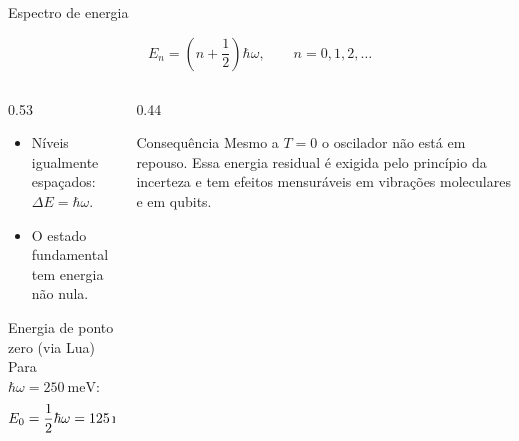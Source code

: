 \begin{frame}{Espectro de energia}
  \begin{equacao}
    \[
      E_n = \left(n+\frac12\right)\hbar\omega,
      \qquad n = 0,1,2,\ldots
    \]
  \end{equacao}

  \begin{columns}[T,onlytextwidth]
    \begin{column}{0.53\textwidth}
      \begin{itemize}
        \item Níveis \alert{igualmente espaçados}:
              $\Delta E = \hbar\omega$.
        \item O estado fundamental tem energia \alert{não nula}.
      \end{itemize}
      \begin{destaque}{Energia de ponto zero (via Lua)}
        Para $\hbar\omega = 250\ \mathrm{meV}$:
        \[
          E_0 = \frac12\hbar\omega = \energia{0}{250}
        \]
      \end{destaque}
    \end{column}
    \begin{column}{0.44\textwidth}
      \begin{destaque}[fisicaamber]{Consequência}
        Mesmo a $T=0$ o oscilador não está em repouso. Essa energia
        residual é exigida pelo princípio da incerteza e tem efeitos
        mensuráveis em vibrações moleculares e em qubits.
      \end{destaque}
    \end{column}
  \end{columns}
\end{frame}

